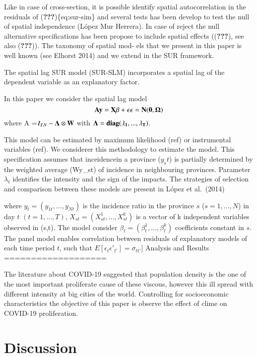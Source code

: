 \documentclass[]{elsarticle} %
\begin{document}
Like in case of cross-section, it is possible identify spatial
autocorrelation in the residuals of ({\textbf{???}})\{eq:sur-sim\} and
several tests has been develop to test the null of spatial independence
(López Mur Herrera). In case of reject the null alternative
specifications has been propose to include spatial effects
(({\textbf{???}}), see also ({\textbf{???}})). The taxonomy of spatial
mod- els that we present in this paper is well known (see Elhorst 2014)
and we extend in the SUR framework.

The spatial lag SUR model (SUR-SLM) incorporates a spatial lag of the
dependent variable as an explanatory factor.

In this paper we consider the spatial lag model \begin{equation}
\bf{A}y = X \beta + \epsilon \\
\epsilon =N(0,\Omega)
\label{eq:sur-slm}
\end{equation} where A =\(I_{TN}-\bf{\Lambda} \otimes W\) with
\(\bf{\Lambda} = diag(\lambda_1,...,\lambda_T)\).

This model can be estimated by maximum likelihood (ref) or instrumental
variables (ref). We considerer this methodology to estimate the model.
This specification assumes that inceidencein a province (\(y_st\)) is
partially determined by the weighted average (Wy\_st) of incidence in
neighbouring provinces. Parameter \(\lambda_t\) identifies the intensity
and the sign of the impacts. The strategies of selection and comparison
between these models are present in López et al.~(2014)

where \(y_{t}=(y_{1t},...,y_{Nt})\) is the incidence ratio in the
province \(s\) (\(s=1,...,N\)) in day \(t\) \((t=1,...,T)\),
\(X_{st}=(X^1_{st},...,X^k_{st})\) is a vector of k independent
variables observed in (s,t). The model consider
\(\beta_t=(\beta^1_t,...,\beta^k_t)\) coefficients constant in \(s\).
The panel model enables correlation between residuals of explanatory
models of each time period \(t\), such that
\(E[\epsilon_t \epsilon'_{t'}]=\sigma_{tt'}]\) Analysis and Results
===================

The literature about COVID-19 suggested that population density is the
one of the most important proliferate cause of these viscous, however
this ill spread with different intensity at big cities of the world.
Controlling for socioeconomic characteristics the objective of this
paper is observe the effect of clime on COVID-19 proliferation.

\hypertarget{discussion}{%
\section{Discussion}\label{discussion}}
\end{document}
